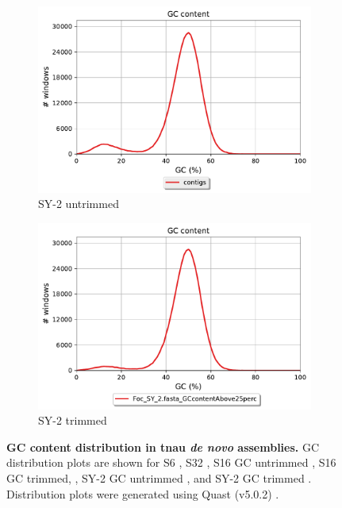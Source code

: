 \begin{figure}[h!]
\begin{subfigure}[]{0.49\textwidth}
        \includegraphics[width=\textwidth]{Figures/SY-2_GC_content_plot_untrimmed.pdf}
        \caption{SY-2 untrimmed}
        \label{fig:SY2GCuntrimmed}
    \end{subfigure}
    \begin{subfigure}[]{0.49\textwidth}
        \centering
        \includegraphics[width=\textwidth]{Figures/SY-2_GC_content_plot_trimmed.pdf}
        \caption{SY-2 trimmed}
        \label{fig:SY2GCtrimmed}
    \end{subfigure}
    \caption[GC content distribution in \acl{tnau} \textit{de novo} assemblies]{\textbf{GC content distribution in \acl{tnau} \textit{de novo} assemblies.} GC distribution plots are shown for 
    S6 \textbf{}, 
    S32 \textbf{}, 
    S16 GC untrimmed \textbf{}, 
    S16 GC trimmed, \textbf{}, 
    SY-2 GC untrimmed \textbf{}, 
    and SY-2 GC trimmed \textbf{}. Distribution plots were generated using Quast (v5.0.2) \parencite{Gurevich2013}.}
        \label{fig:tnuaGCplots}
\end{figure}



